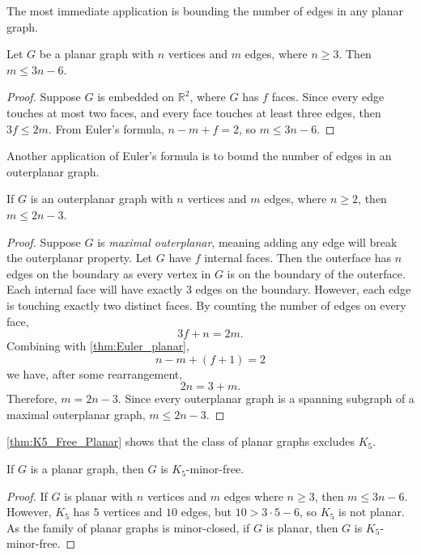 The most immediate application is bounding the number of edges in any planar graph.
\begin{proposition}\label{thm:planar_graph_edge_bound}
	Let $G$ be a planar graph with $n$ vertices and $m$ edges, where $n \geq 3$. Then $m \leq 3n - 6$.
\end{proposition}
\begin{proof}
	Suppose $G$ is embedded on $\mathbb{R}^2$, where $G$ has $f$ faces. Since every edge touches at most two faces, and every face touches at least three edges, then $3f \leq 2m$. From Euler's formula, $n - m + f = 2$, so $m \leq 3n - 6$. 
\end{proof}

Another application of Euler's formula is to bound the number of edges in an outerplanar graph.
\begin{proposition}\label{thm:outerplanar_bound}
	If \(G\) is an outerplanar graph with \(n\) vertices and \(m\) edges, where $n \geq 2$, then \(m \leq 2n - 3\).
\end{proposition}

\begin{proof}
	Suppose \(G\) is \textit{maximal outerplanar}, meaning adding any edge will break the outerplanar property. Let $G$ have \(f\) internal faces. Then the outerface has \(n\) edges on the boundary as every vertex in $G$ is on the boundary of the outerface. Each internal face will have exactly \(3\) edges on the boundary. However, each edge is touching exactly two distinct faces. By counting the number of edges on every face,
	\begin{equation*}
		3 f + n = 2m.
	\end{equation*}
	Combining with \cref{thm:Euler_planar},
	\begin{equation*}
		n - m + (f + 1) = 2
	\end{equation*}
	we have, after some rearrangement,
	\begin{equation*}
		2n = 3 + m.
	\end{equation*}
	Therefore, \(m = 2n - 3\). Since every outerplanar graph is a spanning subgraph of a maximal outerplanar graph, \(m \leq 2n - 3\).
\end{proof}
\cref{thm:K5_Free_Planar} shows that the class of planar graphs excludes $K_5$. 
\begin{lemma}\label{thm:K5_Free_Planar}
	If \(G\) is a planar graph, then \(G\) is \(K_5\)-minor-free.
\end{lemma}
\begin{proof}
	If \(G\) is planar with \(n\) vertices and \(m\) edges where $n \geq 3$, then \(m \leq 3n -6\).
	However, \(K_5\) has \(5\) vertices and \(10\) edges, but  \( 10 > 3 \cdot 5 - 6\), so \(K_5\) is not planar. As the family of planar graphs is minor-closed, if \(G\) is planar, then $G$ is \(K_5\)-minor-free.
\end{proof}

